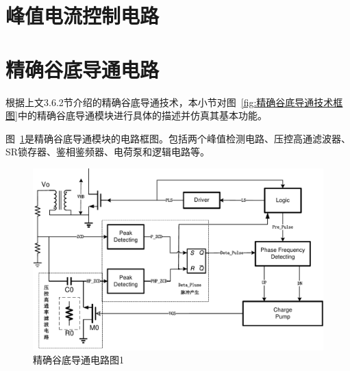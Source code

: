 

\section{峰值电流控制电路}
\label{sec:峰值电流控制电路}




\section{精确谷底导通电路}

根据上文3.6.2节介绍的精确谷底导通技术，本小节对图~\ref{fig:精确谷底导通技术框图}中的精确谷底导通模块进行具体的描述并仿真其基本功能。

图~\ref{fig:精确谷底导通电路图1}是精确谷底导通模块的电路框图。包括两个峰值检测电路、压控高通滤波器、SR锁存器、鉴相鉴频器、电荷泵和逻辑电路等。

\begin{figure}[htbp] 
    \centering
    \includegraphics[width=0.8\linewidth]{figures/精确谷底导通电路图1.pdf}
    \caption{精确谷底导通电路图1}
    \label{fig:精确谷底导通电路图1}
\end{figure}


